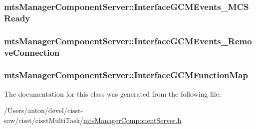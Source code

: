 \subsubsection[{Interface\+G\+C\+M\+Events\+\_\+\+M\+C\+S\+Ready}]{ mts\+Manager\+Component\+Server\+::\+Interface\+G\+C\+M\+Events\+\_\+\+M\+C\+S\+Ready\hspace{0.3cm}{\ttfamily [protected]}}\label{classmts_manager_component_server_a3c150e5ac5a8a4b7b68d30874e8daf73}
\hypertarget{classmts_manager_component_server_a11a899e797a81a3e84bd4bc7c2025344}{}
\subsubsection[{Interface\+G\+C\+M\+Events\+\_\+\+Remove\+Connection}]{ mts\+Manager\+Component\+Server\+::\+Interface\+G\+C\+M\+Events\+\_\+\+Remove\+Connection\hspace{0.3cm}{\ttfamily [protected]}}\label{classmts_manager_component_server_a11a899e797a81a3e84bd4bc7c2025344}
\hypertarget{classmts_manager_component_server_aba31458f9efbd9bd8f3ffc9335f56c9e}{}
\subsubsection[{Interface\+G\+C\+M\+Function\+Map}]{ mts\+Manager\+Component\+Server\+::\+Interface\+G\+C\+M\+Function\+Map\hspace{0.3cm}{\ttfamily [protected]}}\label{classmts_manager_component_server_aba31458f9efbd9bd8f3ffc9335f56c9e}


The documentation for this class was generated from the following file\+:\begin{DoxyCompactItemize}
\item 
/\+Users/anton/devel/cisst-\/saw/cisst/cisst\+Multi\+Task/\hyperlink{mts_manager_component_server_8h}{mts\+Manager\+Component\+Server.\+h}\end{DoxyCompactItemize}
